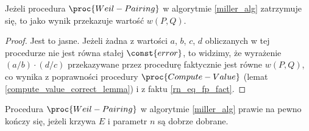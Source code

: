 \begin{theorem}
Jeżeli procedura $\proc{Weil-Pairing}$ w algorytmie \ref{miller_alg}
zatrzymuje się,
to jako wynik przekazuje wartość $w(P, Q)$.
\end{theorem}

\begin{proof}
Jest to jasne. Jeżeli żadna z wartości $a$, $b$, $c$, $d$
obliczanych w tej procedurze nie jest równa stałej $\const{error}$,
to widzimy, że wyrażenie $(a/b)\cdot(d/c)$ przekazywane przez procedurę
faktycznie jest równe $w(P, Q)$,
co wynika z poprawności procedury $\proc{Compute-Value}$
(lemat \ref{compute_value_correct_lemma})
i z faktu \ref{rn_eq_fp_fact}.
\end{proof}

\begin{theorem}
Procedura $\proc{Weil-Pairing}$ w algorytmie \ref{miller_alg}
prawie na pewno kończy się,
jeżeli krzywa $E$ i parametr $n$ są dobrze dobrane.
\end{theorem}

